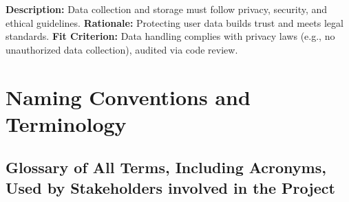 \documentclass[12pt]{article}
\begin{document}
\textbf{Description:} Data collection and storage must follow privacy, security, and ethical guidelines.
\textbf{Rationale:} Protecting user data builds trust and meets legal standards.
\textbf{Fit Criterion:} Data handling complies with privacy laws (e.g., no unauthorized data collection), audited via code review.


\section{Naming Conventions and Terminology}
\subsection{Glossary of All Terms, Including Acronyms, Used by Stakeholders
involved in the Project}
\end{document}
